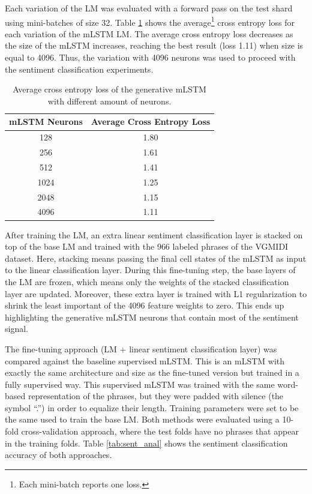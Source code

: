 Each variation of the LM was evaluated with a forward pass on the test shard using mini-batches of size 32. Table \ref{tab:gen_anal} shows the average\footnote{Each mini-batch reports one loss.} cross entropy loss for each variation of the mLSTM LM. The average cross entropy loss decreases as the size of the mLSTM increases, reaching the best result (loss 1.11) when size is equal to 4096. Thus, the variation with 4096 neurons was used to proceed with the sentiment classification experiments.

\begin{table}[!h]
 \begin{center}
 \begin{tabular}{cc}
  \hline
  \textbf{mLSTM Neurons} & \textbf{Average Cross Entropy Loss}\\ \hline
  128 & 1.80   \\
  256  & 1.61  \\
  512  & 1.41  \\
  1024 & 1.25  \\
  2048 & 1.15  \\
  4096 & 1.11  \\ \hline
 \end{tabular}
\end{center}
\caption{Average cross entropy loss of the generative mLSTM with different amount of neurons.}
 \label{tab:gen_anal}
\end{table}

After training the LM, an extra linear sentiment classification layer is stacked on top of the base LM and trained with the 966 labeled phrases of the VGMIDI dataset. Here, stacking means passing the final cell states of the mLSTM as input to the linear classification layer. During this fine-tuning step, the base layers of the LM are frozen, which means only the weights of the stacked classification layer are updated. Moreover, these extra layer is trained with L1 regularization to shrink the least important of the 4096 feature weights to zero. This ends up highlighting the generative mLSTM neurons that contain most of the sentiment signal.

The fine-tuning approach (LM + linear sentiment classification layer) was compared against the baseline supervised mLSTM. This is an mLSTM with exactly the same architecture and size as the fine-tuned version but trained in a fully supervised way. This supervised mLSTM was trained with the same word-based representation of the phrases, but they were padded with silence (the symbol ``.'') in order to equalize their length. Training parameters were set to be the same used to train the base LM. Both methods were evaluated using a 10-fold cross-validation approach, where the test folds have no phrases that appear in the training folds. Table \ref{tab:sent_anal} shows the sentiment classification accuracy of both approaches.

